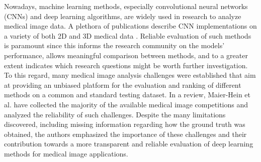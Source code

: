 \documentclass[fleqn,10pt]{wlscirep}
\begin{document}
Nowadays, machine learning methods, especially convolutional neural networks (CNNs) and deep learning algorithms, are widely used in research to analyze medical image data. A plethora of publications describe CNN implementations on a variety of both 2D and 3D medical data \cite{litjens2017survey, ker2017deep, anwar2018medical}. Reliable evaluation of such methods is paramount since this informs the research community on the models’ performance, allows meaningful comparison between methods, and to a greater extent indicates which research questions might be worth further investigation. To this regard, many medical image analysis challenges were established that aim at providing an unbiased platform for the evaluation and ranking of different methods on a common and standard testing dataset. In a review, Maier-Hein et al. \cite{maier2018rankings} have collected the majority of the available medical image competitions and analyzed the reliability of such challenges. Despite the many limitations discovered, including missing information regarding how the ground truth was obtained, the authors emphasized the importance of these challenges and their contribution towards a more transparent and reliable evaluation of deep learning methods for medical image applications.
\end{document}
